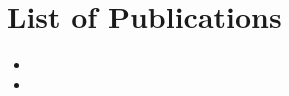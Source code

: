 \chapter*{List of Publications}

\begin{itemize}
  \item [TODO: Publication entry 1]
  \item [TODO: Publication entry 2]
\end{itemize}
